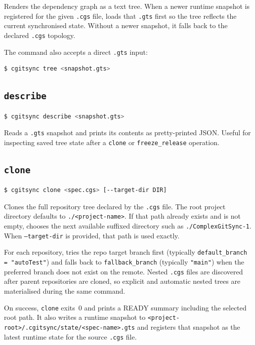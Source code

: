 \documentclass[11pt,a4paper]{article}
\begin{document}
Renders the dependency graph as a text tree. When a newer runtime snapshot is
registered for the given \texttt{.cgs} file, \cgscli{} loads that
\texttt{.gts} first so the tree reflects the current synchronised state.
Without a newer snapshot, it falls back to the declared \texttt{.cgs}
topology.

The command also accepts a direct \texttt{.gts} input:

\begin{lstlisting}[language=bash]
$ cgitsync tree <snapshot.gts>
\end{lstlisting}

\subsection{\texttt{describe}}

\begin{lstlisting}[language=bash]
$ cgitsync describe <snapshot.gts>
\end{lstlisting}

Reads a \texttt{.gts} snapshot and prints its contents as pretty-printed
JSON. Useful for inspecting saved tree state after a \texttt{clone} or
\texttt{freeze\_release} operation.

\subsection{\texttt{clone}}

\begin{lstlisting}[language=bash]
$ cgitsync clone <spec.cgs> [--target-dir DIR]
\end{lstlisting}

Clones the full repository tree declared by the \texttt{.cgs} file. The root
project directory defaults to \texttt{./<project-name>}. If that path already
exists and is not empty, \cgscli{} chooses the next available suffixed
directory such as \texttt{./ComplexGitSync-1}. When \texttt{--target-dir} is
provided, that path is used exactly.

For each repository, \cgscli{} tries the repo target branch first
(typically \texttt{default\_branch = "autoTest"}) and falls back to
\texttt{fallback\_branch} (typically \texttt{"main"}) when the preferred
branch does not exist on the remote. Nested \texttt{.cgs} files are discovered
after parent repositories are cloned, so explicit and automatic nested trees
are materialised during the same command.

On success, \texttt{clone} exits~0 and prints a READY summary including the
selected root path. It also writes a runtime snapshot to
\texttt{<project-root>/.cgitsync/state/<spec-name>.gts} and registers that
snapshot as the latest runtime state for the source \texttt{.cgs} file.
\end{document}
